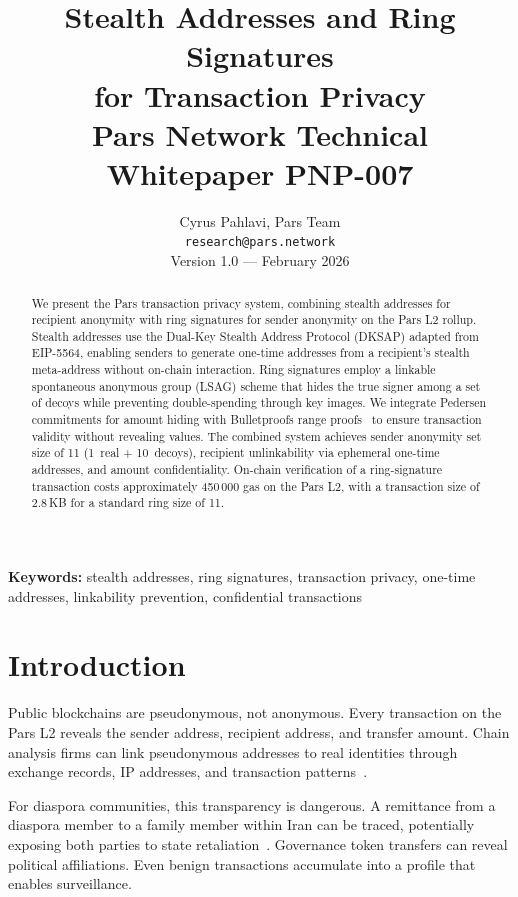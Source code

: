 \documentclass[11pt,a4paper]{article}
\title{%
    \textbf{Stealth Addresses and Ring Signatures\\
    for Transaction Privacy}\\[0.5em]
    \large Pars Network Technical Whitepaper PNP-007
}
\author{%
    Cyrus Pahlavi, Pars Team\\
    \texttt{research@pars.network}\\[0.5em]
    \small Version 1.0 --- February 2026
}
\date{}
\begin{document}
\parscoverpage

\thispagestyle{fancy}

\begin{abstract}
\noindent
We present the Pars transaction privacy system, combining stealth addresses
for recipient anonymity with ring signatures for sender anonymity on the
Pars L2 rollup.  Stealth addresses use the Dual-Key Stealth Address
Protocol (DKSAP) adapted from EIP-5564, enabling senders to generate
one-time addresses from a recipient's stealth meta-address without
on-chain interaction.  Ring signatures employ a linkable spontaneous
anonymous group (LSAG) scheme that hides the true signer among a set of
decoys while preventing double-spending through key images.  We integrate
Pedersen commitments for amount hiding with Bulletproofs range
proofs~\cite{bunz2018bulletproofs} to ensure transaction validity without
revealing values.  The combined system achieves sender anonymity set size
of 11 (1~real + 10~decoys), recipient unlinkability via ephemeral one-time
addresses, and amount confidentiality.  On-chain verification of a
ring-signature transaction costs approximately 450\,000 gas on the Pars L2,
with a transaction size of 2.8\,KB for a standard ring size of 11.
\end{abstract}

\vspace{1em}
\noindent\textbf{Keywords:} stealth addresses, ring signatures, transaction
privacy, one-time addresses, linkability prevention, confidential transactions

\tableofcontents
\newpage

\section{Introduction}
\label{sec:introduction}

Public blockchains are pseudonymous, not anonymous.  Every transaction on
the Pars L2 reveals the sender address, recipient address, and transfer
amount.  Chain analysis firms can link pseudonymous addresses to real
identities through exchange records, IP addresses, and transaction
patterns~\cite{meiklejohn2013fistful}.

For diaspora communities, this transparency is dangerous.  A remittance
from a diaspora member to a family member within Iran can be traced,
potentially exposing both parties to state
retaliation~\cite{freedomhouse2023iran}.  Governance token transfers can
reveal political affiliations.  Even benign transactions accumulate into a
profile that enables surveillance.
\end{document}
